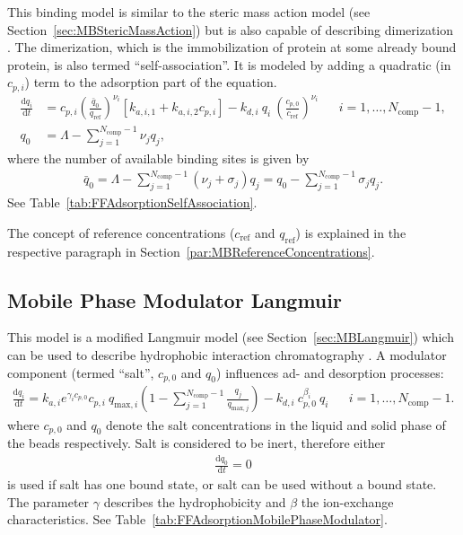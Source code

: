 This binding model is similar to the steric mass action model (see Section~\ref{sec:MBStericMassAction}) but is also capable of describing dimerization \cite{Mollerup2008,Westerberg2012}. 
The dimerization, which is the immobilization of protein at some already bound protein, is also termed ``self-association''.
It is modeled by adding a quadratic (in $c_{p,i}$) term to the adsorption part of the equation.
\begin{align*}
  \frac{\mathrm{d} q_i}{\mathrm{d} t} &= c_{p,i}\left( \frac{\bar{q}_0}{q_{\text{ref}}} \right)^{\nu_i} \left[ k_{a,i,1} + k_{a,i,2} c_{p,i} \right] - k_{d,i}\: q_i\: \left(\frac{c_{p,0}}{c_{\text{ref}}}\right)^{\nu_i} && i = 1, \dots, N_{\text{comp}} - 1, \\
  q_0 &= \Lambda - \sum_{j=1}^{N_{\text{comp}} - 1} \nu_j q_j,
\end{align*}
where the number of available binding sites is given by
\begin{align*}
  \bar{q}_0 = \Lambda - \sum_{j=1}^{N_{\text{comp}} - 1} \left( \nu_j + \sigma_j \right) q_j = q_0 - \sum_{j=1}^{N_{\text{comp}} - 1} \sigma_j q_j.
\end{align*}
See Table~\ref{tab:FFAdsorptionSelfAssociation}.

The concept of reference concentrations ($c_{\text{ref}}$ and $q_{\text{ref}}$) is explained in the respective paragraph in Section~\ref{par:MBReferenceConcentrations}.

\subsection{Mobile Phase Modulator Langmuir}

This model is a modified Langmuir model (see Section~\ref{sec:MBLangmuir}) which can be used to describe hydrophobic interaction chromatography \cite{Melander1989,Karlsson2004}. 
A modulator component (termed ``salt'', $c_{p,0}$ and $q_0$) influences ad- and desorption processes:
\begin{align*}
  \frac{\mathrm{d} q_i}{\mathrm{d} t} = k_{a,i} e^{\gamma_i c_{p,0}} c_{p,i}\: q_{\text{max},i} \left( 1 - \sum_{j=1}^{N_{\text{comp}} - 1} \frac{q_j}{q_{\text{max},j}} \right) - k_{d,i} \: c_{p,0}^{\beta_i} \: q_i && i = 1, \dots, N_{\text{comp}} - 1.
\end{align*}
where $c_{p,0}$ and $q_0$ denote the salt concentrations in the liquid and solid phase of the beads respectively. 
Salt is considered to be inert, therefore either
\begin{align*}
  \frac{\mathrm{d} q_0}{\mathrm{d} t} = 0
\end{align*}
is used if salt has one bound state, or salt can be used without a bound state.
The parameter $\gamma$ describes the hydrophobicity and $\beta$ the ion-exchange characteristics.
See Table~\ref{tab:FFAdsorptionMobilePhaseModulator}.

